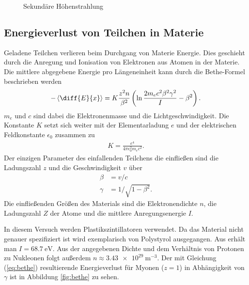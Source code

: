 \begin{figure}[h]
\begin{subfigure}[h]{0.5\textwidth}
  \label{fig:fluss}
  \end{subfigure}
  \caption{Sekundäre Höhenstrahlung}
\end{figure}

\subsection{Energieverlust von Teilchen in Materie}
Geladene Teilchen verlieren beim Durchgang von Materie Energie. Dies geschieht durch die Anregung und Ionisation von Elektronen aus Atomen in der Materie. Die mittlere abgegebene Energie pro Längeneinheit kann durch die Bethe-Formel beschrieben werden
\begin{align}
  -\left\langle \diff{E}{x} \right\rangle=K\frac{z^2n}{\beta^2}\left(\ln \frac{2m_ec^2\beta^2\gamma^2}{I} -\beta^2 \right).
  \label{eq:bethe}
\end{align}
$m_e$ und $c$ sind dabei die Elektronenmasse und die Lichtgeschwindigkeit. Die Konstante $K$ setzt sich weiter mit der Elementarladung $e$ und der elektrischen Feldkonstante $\epsilon_0$ zusammen zu
\begin{align*}
  K=\frac{e^4}{4\pi \epsilon_0^2m_ec^2}.
\end{align*}
Der einzigen Parameter des einfallenden Teilchens die einfließen sind die Ladungszahl $z$ und die Geschwindigkeit $v$ über
\begin{align*}
  \beta&=v/c\\
  \gamma&=1/\sqrt{1-\beta^2}.
\end{align*}
Die einfließenden Größen des Materials sind die Elektronendichte $n$, die Ladungszahl $Z$ der Atome und die mittlere Anregungsenergie $I$.

In diesem Versuch werden Plastikszintillatoren verwendet. Da das Material nicht genauer spezifiziert ist wird exemplarisch von Polystyrol ausgegangen. Aus \cite{polystyrene} erhält man $I=\SI{68.7}{\electronvolt}$. Aus der angegebenen Dichte und dem Verhältnis von Protonen zu Nukleonen folgt außerdem $n\approx \SI{3.43e29}{\metre^{-3}}$. Der mit Gleichung (\ref{eq:bethe}) resultierende Energieverlust für Myonen ($z=1$) in Abhängigkeit von $\gamma$ ist in Abbildung \ref{fig:bethe} zu sehen.

